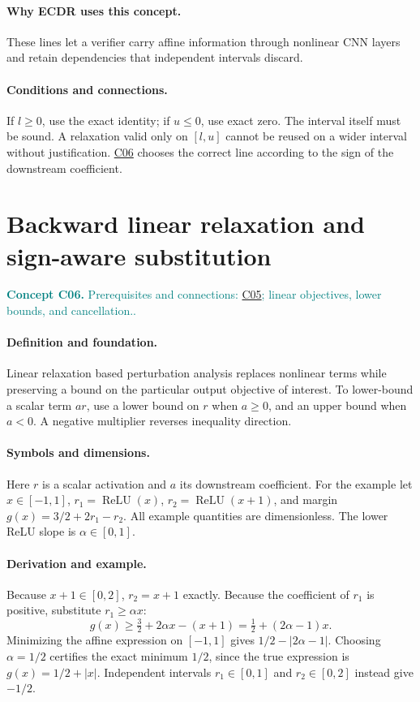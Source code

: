 \documentclass[11pt,a4paper]{article}
\newcommand{\abs}[1]{\left\lvert#1\right\rvert}
\newcommand{\relu}{\operatorname{ReLU}}
\newcommand{\conceptid}{Front matter}
\newcommand{\concept}[3]{\clearpage\renewcommand{\conceptid}{#1}%
\section{#2}\label{concept:#1}%
\textcolor{teal}{\textbf{Concept #1.} Prerequisites and connections: #3.}\par
\typeout{ECDR-CONCEPT-START #1 PAGE=\thepage}}
\begin{document}
\paragraph{Why ECDR uses this concept.}
These lines let a verifier carry affine information through nonlinear CNN layers and retain dependencies that independent intervals discard.
\paragraph{Conditions and connections.}
If $l\ge0$, use the exact identity; if $u\le0$, use exact zero. The interval itself must be sound. A relaxation valid only on $[l,u]$ cannot be reused on a wider interval without justification. \hyperref[concept:C06]{C06} chooses the correct line according to the sign of the downstream coefficient.
\par\label{endconcept:C05}

\concept{C06}{Backward linear relaxation and sign-aware substitution}{\hyperref[concept:C05]{C05}; linear objectives, lower bounds, and cancellation.}
\paragraph{Definition and foundation.}
Linear relaxation based perturbation analysis replaces nonlinear terms while preserving a bound on the particular output objective of interest. To lower-bound a scalar term $a r$, use a lower bound on $r$ when $a\ge0$, and an upper bound when $a<0$. A negative multiplier reverses inequality direction.
\paragraph{Symbols and dimensions.}
Here $r$ is a scalar activation and $a$ its downstream coefficient. For the example let $x\in[-1,1]$, $r_1=\relu(x)$, $r_2=\relu(x+1)$, and margin $g(x)=3/2+2r_1-r_2$. All example quantities are dimensionless. The lower ReLU slope is $\alpha\in[0,1]$.
\paragraph{Derivation and example.}
Because $x+1\in[0,2]$, $r_2=x+1$ exactly. Because the coefficient of $r_1$ is positive, substitute $r_1\ge\alpha x$:
\[
 g(x)\ge\tfrac32+2\alpha x-(x+1)
 =\tfrac12+(2\alpha-1)x.
\]
Minimizing the affine expression on $[-1,1]$ gives $1/2-\abs{2\alpha-1}$. Choosing $\alpha=1/2$ certifies the exact minimum $1/2$, since the true expression is $g(x)=1/2+\abs{x}$. Independent intervals $r_1\in[0,1]$ and $r_2\in[0,2]$ instead give $-1/2$.
\end{document}
